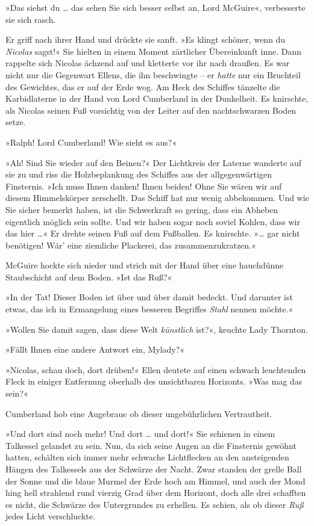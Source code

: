 »Das siehst du … das sehen Sie sich besser selbst an, Lord
McGuire«, verbesserte sie sich rasch.

\bigpar

Er griff nach ihrer Hand und drückte sie sanft. »Es klingt schöner,
wenn du \emph{Nicolas} sagst!« Sie hielten in einem Moment
zärtlicher Übereinkunft inne. Dann rappelte sich Nicolas ächzend
auf und kletterte vor ihr nach draußen. Es war nicht nur die
Gegenwart Ellens, die ihn beschwingte – er \emph{hatte} nur ein
Bruchteil des Gewichtes, das er auf der Erde wog. Am Heck des
Schiffes tänzelte die Karbidlaterne in der Hand von Lord Cumberland
in der Dunkelheit. Es knirschte, als Nicolas seinen Fuß vorsichtig
von der Leiter auf den nachtschwarzen Boden setze.

»Ralph! Lord Cumberland! Wie sieht es aus?«

»Ah! Sind Sie wieder auf den Beinen?« Der Lichtkreis der Laterne
wanderte auf sie zu und riss die Holzbeplankung des Schiffes aus
der allgegenwärtigen Finsternis. »Ich muss Ihnen danken! Ihnen
beiden! Ohne Sie wären wir auf diesem Himmelskörper zerschellt. Das
Schiff hat nur wenig abbekommen. Und wie Sie sicher bemerkt haben,
ist die Schwerkraft so gering, dass ein Abheben eigentlich möglich
sein sollte. Und wir haben sogar noch soviel Kohlen, dass wir das
hier …« Er drehte seinen Fuß auf dem Fußballen. Es knirschte. »…
gar nicht benötigen! Wär’ eine ziemliche Plackerei, das
zusammenzukratzen.«

McGuire hockte sich nieder und strich mit der Hand über eine
hauchdünne Staubschicht auf dem Boden. »Ist das Ruß?«

»In der Tat! Dieser Boden ist über und über damit bedeckt. Und
darunter ist etwas, das ich in Ermangelung eines besseren Begriffes
\emph{Stahl} nennen möchte.«

»Wollen Sie damit sagen, dass diese Welt \emph{künstlich} ist?«,
keuchte Lady Thornton.

»Fällt Ihnen eine andere Antwort ein, Mylady?«

\tb

»Nicolas, schau doch, dort drüben!« Ellen deutete auf einen schwach
leuchtenden Fleck in einiger Entfernung oberhalb des unsichtbaren
Horizonts. »Was mag das sein?«

\bigpar

Cumberland hob eine Augebraue ob dieser ungebührlichen
Vertrautheit.

\bigpar

»Und dort sind noch mehr! Und dort … und dort!« Sie schienen in
einem Talkessel gelandet zu sein. Nun, da sich seine Augen an die
Finsternis gewöhnt hatten, schälten sich immer mehr schwache
Lichtflecken an den ansteigenden Hängen des Talkessels aus der
Schwärze der Nacht. Zwar standen der grelle Ball der Sonne und die
blaue Murmel der Erde hoch am Himmel, und auch der Mond hing hell
strahlend rund vierzig Grad über dem Horizont, doch alle drei
schafften es nicht, die Schwärze des Untergrundes zu erhellen. Es
schien, als ob dieser \emph{Ruß} jedes Licht verschluckte.

